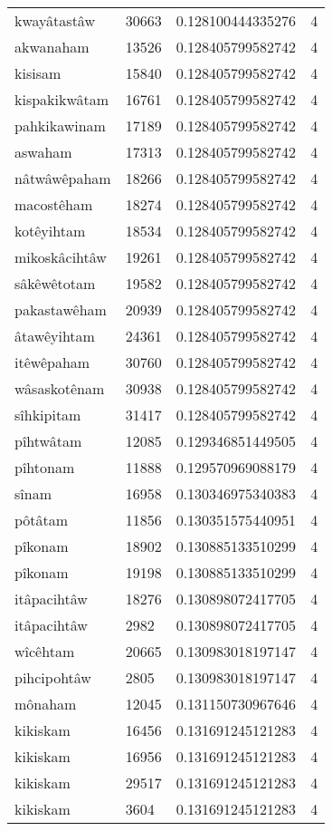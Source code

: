 \begin{longtable}{llll}
kwayâtastâw & 30663 & 0.128100444335276 & 4 \\
akwanaham & 13526 & 0.128405799582742 & 4 \\
kisisam & 15840 & 0.128405799582742 & 4 \\
kispakikwâtam & 16761 & 0.128405799582742 & 4 \\
pahkikawinam & 17189 & 0.128405799582742 & 4 \\
aswaham & 17313 & 0.128405799582742 & 4 \\
nâtwâwêpaham & 18266 & 0.128405799582742 & 4 \\
macostêham & 18274 & 0.128405799582742 & 4 \\
kotêyihtam & 18534 & 0.128405799582742 & 4 \\
mikoskâcihtâw & 19261 & 0.128405799582742 & 4 \\
sâkêwêtotam & 19582 & 0.128405799582742 & 4 \\
pakastawêham & 20939 & 0.128405799582742 & 4 \\
âtawêyihtam & 24361 & 0.128405799582742 & 4 \\
itêwêpaham & 30760 & 0.128405799582742 & 4 \\
wâsaskotênam & 30938 & 0.128405799582742 & 4 \\
sîhkipitam & 31417 & 0.128405799582742 & 4 \\
pîhtwâtam & 12085 & 0.129346851449505 & 4 \\
pîhtonam & 11888 & 0.129570969088179 & 4 \\
sînam & 16958 & 0.130346975340383 & 4 \\
pôtâtam & 11856 & 0.130351575440951 & 4 \\
pîkonam & 18902 & 0.130885133510299 & 4 \\
pîkonam & 19198 & 0.130885133510299 & 4 \\
itâpacihtâw & 18276 & 0.130898072417705 & 4 \\
itâpacihtâw & 2982 & 0.130898072417705 & 4 \\
wîcêhtam & 20665 & 0.130983018197147 & 4 \\
pihcipohtâw & 2805 & 0.130983018197147 & 4 \\
mônaham & 12045 & 0.131150730967646 & 4 \\
kikiskam & 16456 & 0.131691245121283 & 4 \\
kikiskam & 16956 & 0.131691245121283 & 4 \\
kikiskam & 29517 & 0.131691245121283 & 4 \\
kikiskam & 3604 & 0.131691245121283 & 4 \\

\end{longtable}
